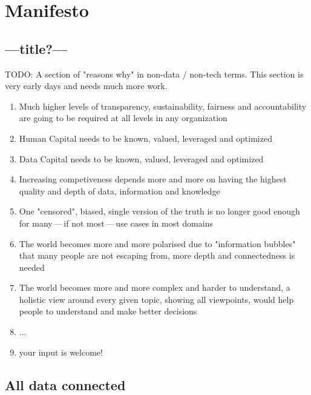 \chapter{Manifesto}\label{ch:ekg-manifesto}

\section{---title?---}

TODO: A section of "reasons why" in non-data / non-tech terms. This section is very early days and needs much more work.

\begin{enumerate}
    \item Much higher levels of transparency, sustainability, fairness and accountability are going to be required at all levels in any organization
    \item Human Capital needs to be known, valued, leveraged and optimized
    \item Data Capital needs to be known, valued, leveraged and optimized
    \item Increasing competiveness depends more and more on having the highest quality and depth of data, information and knowledge
    \item One "censored", biased, single version of the truth is no longer good enough for many\,---\,if not most\,---\,use cases in most domains
    \item The world becomes more and more polarised due to "information bubbles" that many people are not escaping from, more depth and connectedness is needed
    \item The world becomes more and more complex and harder to understand, a holistic view around every given topic, showing all viewpoints, would help people to understand and make better decisions
    \item ...
    \item your input is welcome!
\end{enumerate}

\section{All data connected}

